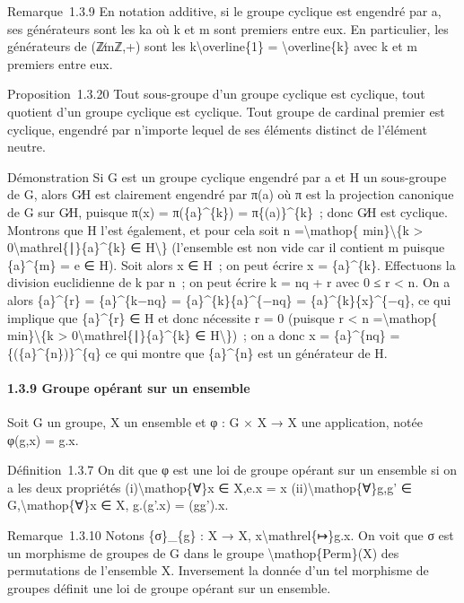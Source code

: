 \documentclass[]{article}
\begin{document}
Remarque~1.3.9 En notation additive, si le groupe cyclique est engendré
par a, ses générateurs sont les ka où k et m sont premiers entre eux. En
particulier, les générateurs de (ℤ∕mℤ,+) sont les
k\textbackslash{}overline\{1\} = \textbackslash{}overline\{k\} avec k et
m premiers entre eux.

Proposition~1.3.20 Tout sous-groupe d'un groupe cyclique est cyclique,
tout quotient d'un groupe cyclique est cyclique. Tout groupe de cardinal
premier est cyclique, engendré par n'importe lequel de ses éléments
distinct de l'élément neutre.

Démonstration Si G est un groupe cyclique engendré par a et H un
sous-groupe de G, alors G∕H est clairement engendré par π(a) où π est la
projection canonique de G sur G∕H, puisque π(x) = π(\{a\}\^{}\{k\}) =
π\{(a)\}\^{}\{k\}~; donc G∕H est cyclique. Montrons que H l'est
également, et pour cela soit n =\textbackslash{}mathop\{
min\}\textbackslash{}\{k \textgreater{}
0\textbackslash{}mathrel\{∣\}\{a\}\^{}\{k\} ∈ H\textbackslash{}\}
(l'ensemble est non vide car il contient m puisque \{a\}\^{}\{m\} = e ∈
H). Soit alors x ∈ H~; on peut écrire x = \{a\}\^{}\{k\}. Effectuons la
division euclidienne de k par n~; on peut écrire k = nq + r avec 0 ≤ r
\textless{} n. On a alors \{a\}\^{}\{r\} = \{a\}\^{}\{k−nq\} =
\{a\}\^{}\{k\}\{a\}\^{}\{−nq\} = \{a\}\^{}\{k\}\{x\}\^{}\{−q\}, ce qui
implique que \{a\}\^{}\{r\} ∈ H et donc nécessite r = 0 (puisque r
\textless{} n =\textbackslash{}mathop\{ min\}\textbackslash{}\{k
\textgreater{} 0\textbackslash{}mathrel\{∣\}\{a\}\^{}\{k\} ∈
H\textbackslash{}\})~; on a donc x = \{a\}\^{}\{nq\} =
\{(\{a\}\^{}\{n\})\}\^{}\{q\} ce qui montre que \{a\}\^{}\{n\} est un
générateur de H.

\paragraph{1.3.9 Groupe opérant sur un ensemble}

Soit G un groupe, X un ensemble et φ : G × X → X une application, notée
φ(g,x) = g.x.

Définition~1.3.7 On dit que φ est une loi de groupe opérant sur un
ensemble si on a les deux propriétés (i)\textbackslash{}mathop\{∀\}x ∈
X,e.x = x (ii)\textbackslash{}mathop\{∀\}g,g' ∈
G,\textbackslash{}mathop\{∀\}x ∈ X, g.(g'.x) = (gg').x.

Remarque~1.3.10 Notons \{σ\}\_\{g\} : X → X,
x\textbackslash{}mathrel\{↦\}g.x. On voit que σ est un morphisme de
groupes de G dans le groupe \textbackslash{}mathop\{Perm\}(X) des
permutations de l'ensemble X. Inversement la donnée d'un tel morphisme
de groupes définit une loi de groupe opérant sur un ensemble.
\end{document}
